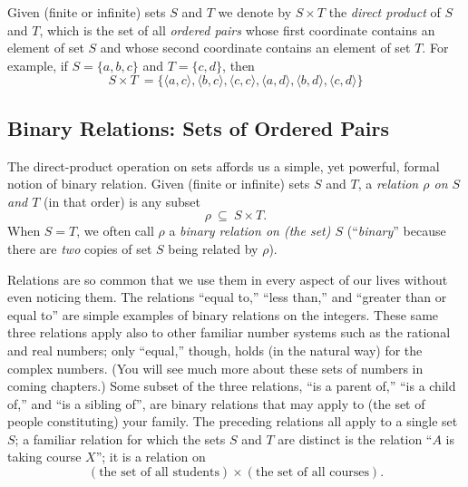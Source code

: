Given (finite or infinite) sets $S$ and $T$ we denote by $S \times T$
 the {\it direct product} of $S$ and $T$,
 which is the set of all {\it ordered
  pairs}  whose first coordinate
contains an element of set $S$ and whose second coordinate contains an
element of set $T$.  For example, if $S = \{a,b,c\}$ and $T =
\{c,d\}$, then
\[ S \times T \ =  \{
\langle a,c \rangle,
\langle b,c \rangle,
\langle c,c \rangle,
\langle a,d \rangle,
\langle b,d \rangle,
\langle c,d \rangle\}
\]


\subsection{Binary Relations: Sets of Ordered Pairs}
\label{sec:relation}

The direct-product operation on sets affords us a simple, yet
powerful, formal notion of binary relation.  Given (finite or
infinite) sets $S$ and $T$, a {\it relation $\rho$ on $S$ and
  $T$} (in that order) is any subset
\[ \rho \ \subseteq \ S \times T. \]
When $S = T$, we often call $\rho$ a {\em binary relation on (the set)
  $S$} (``{\em binary}'' because there
are {\em two} copies of set $S$ being related by $\rho$).

Relations are so common that we use them in every aspect of our lives
without even noticing them.  The relations ``equal to,'' ``less
than,'' and ``greater than or equal to'' are simple examples of binary
relations on the integers.  These same three relations apply also to
other familiar number systems such as the rational and real numbers;
only ``equal,'' though, holds (in the natural way) for the complex
numbers. (You will see much more about these sets of numbers in coming
chapters.)  Some subset of the three relations, ``is a parent of,''
``is a child of,'' and ``is a sibling of'', are binary relations that
may apply to (the set of people constituting) your family.  The
preceding relations all apply to a single set $S$; a familiar relation
for which the sets $S$ and $T$ are distinct is the relation ``$A$ is
taking course $X$''; it is a relation on
\[ \left( \mbox{the set of all students} \right) \times
   \left( \mbox{the set of all courses} \right).
\]

